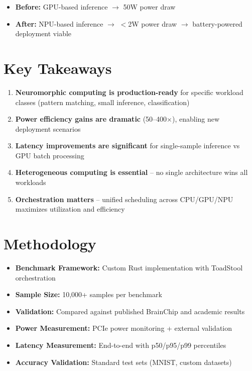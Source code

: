 \documentclass[11pt,a4paper]{article}
\begin{document}
\begin{itemize}[leftmargin=*]
    \item \textbf{Before:} GPU-based inference $\rightarrow$ 50W power draw
    \item \textbf{After:} NPU-based inference $\rightarrow$ $<$2W power draw $\rightarrow$ battery-powered deployment viable
\end{itemize}

\section{Key Takeaways}

\begin{enumerate}[leftmargin=*]
    \item \textbf{Neuromorphic computing is production-ready} for specific workload classes (pattern matching, small inference, classification)
    
    \item \textbf{Power efficiency gains are dramatic} (50--400$\times$), enabling new deployment scenarios
    
    \item \textbf{Latency improvements are significant} for single-sample inference vs GPU batch processing
    
    \item \textbf{Heterogeneous computing is essential} -- no single architecture wins all workloads
    
    \item \textbf{Orchestration matters} -- unified scheduling across CPU/GPU/NPU maximizes utilization and efficiency
\end{enumerate}

\section{Methodology}

\begin{itemize}[leftmargin=*]
    \item \textbf{Benchmark Framework:} Custom Rust implementation with ToadStool orchestration
    \item \textbf{Sample Size:} 10,000+ samples per benchmark
    \item \textbf{Validation:} Compared against published BrainChip and academic results
    \item \textbf{Power Measurement:} PCIe power monitoring + external validation
    \item \textbf{Latency Measurement:} End-to-end with p50/p95/p99 percentiles
    \item \textbf{Accuracy Validation:} Standard test sets (MNIST, custom datasets)
\end{itemize}
\end{document}
